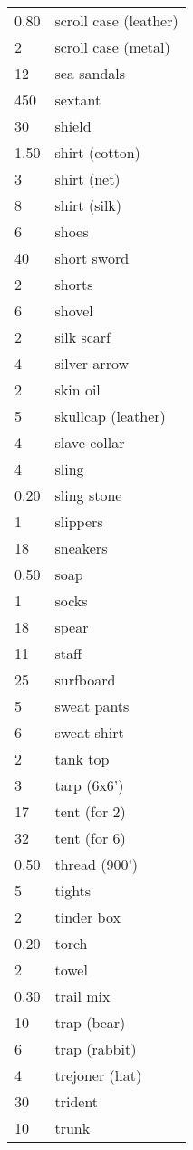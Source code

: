 \begin{normbox}[Equipment]
\begin{tabularx}{\linewidth}{@{} l X }
0.80 & scroll case (leather)\\
2 & scroll case (metal)\\
12 & sea sandals\\
450 & sextant\\
30 & shield\\
1.50 & shirt (cotton)\\
3 & shirt (net)\\
8 & shirt (silk)\\
6 & shoes\\
40 & short sword\\
2 & shorts\\
6 & shovel\\
2 & silk scarf\\
4 & silver arrow\\
2 & skin oil\\
5 & skullcap (leather)\\
4 & slave collar\\
4 & sling\\
0.20 & sling stone\\
1 & slippers\\
18 & sneakers\\
0.50 & soap\\
1 & socks\\
18 & spear\\
11 & staff\\
25 & surfboard\\
5 & sweat pants\\
6 & sweat shirt\\
2 & tank top\\
3 & tarp (6x6')\\
17 & tent (for 2)\\
32 & tent (for 6)\\
0.50 & thread (900')\\
5 & tights\\
2 & tinder box\\
0.20 & torch\\
2 & towel\\
0.30 & trail mix\\
10 & trap (bear)\\
6 & trap (rabbit)\\
4 & trejoner (hat)\\
30 & trident\\
10 & trunk\\

\end{tabularx}
\end{normbox}
